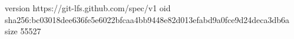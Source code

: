 version https://git-lfs.github.com/spec/v1
oid sha256:bc03018dee636fe5e6022bfcaa4bb9448e82d013efabd9a0fce9d24deca3db6a
size 55527

